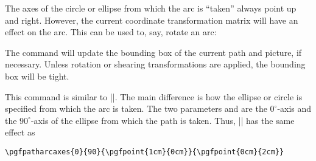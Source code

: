 \begin{command}{\pgfpatharc{}}
    The axes of the circle or ellipse from which the arc is ``taken'' always
    point up and right. However, the current coordinate transformation matrix
    will have an effect on the arc. This can be used to, say, rotate an arc:
\begin{codeexample}[]
\end{codeexample}

    The command will update the bounding box of the current path and picture,
    if necessary. Unless rotation or shearing transformations are applied, the
    bounding box will be tight.
\end{command}

\begin{command}{\pgfpatharcaxes{}}
    This command is similar to |\pgfpatharc|. The main difference is how the
    ellipse or circle is specified from which the arc is taken. The two
    parameters  and  are the $0^\circ$-axis
    and the $90^\circ$-axis of the ellipse from which the path is taken. Thus,
    || has the same effect as
\begin{verbatim}
\pgfpatharcaxes{0}{90}{\pgfpoint{1cm}{0cm}}{\pgfpoint{0cm}{2cm}}
\end{verbatim}
\begin{codeexample}[]
\end{codeexample}
\end{command}

